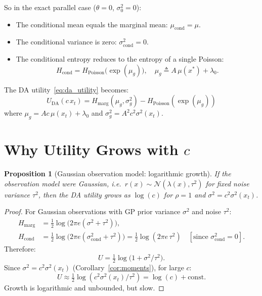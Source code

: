 \documentclass[11pt]{article}
\newtheorem{proposition}{Proposition}
\begin{document}
So in the exact parallel case ($\theta = 0$, $\sigma_0^2 = 0$):
\begin{itemize}
    \item The conditional mean equals the marginal mean: $\mu_{\text{cond}} = \mu$.
    \item The conditional variance is zero: $\sigma^2_{\text{cond}} = 0$.
    \item The conditional entropy reduces to the entropy of a single Poisson:
    \begin{equation}
        H_{\text{cond}} = H_{\text{Poisson}}\!\bigl(\exp(\mu_g)\bigr),
        \quad \mu_g \triangleq A \, \mu(x^*) + \lambda_0.
    \end{equation}
\end{itemize}

The DA utility~\eqref{eq:da_utility} becomes:
\begin{equation}\label{eq:utility_decomp}
    U_{\text{DA}}(c \, x_t) = H_{\text{marg}}(\mu_g, \sigma^2_g) - H_{\text{Poisson}}(\exp(\mu_g))
\end{equation}
where $\mu_g = A c \, \mu(x_t) + \lambda_0$ and $\sigma^2_g = A^2 c^2 \sigma^2(x_t)$.

\section{Why Utility Grows with $c$}

\begin{proposition}[Gaussian observation model: logarithmic growth]\label{prop:gaussian}
If the observation model were Gaussian, i.e.\
$r(x) \sim \mathcal{N}(\lambda(x), \tau^2)$ for fixed noise variance $\tau^2$,
then the DA utility grows as $\log(c)$ for $\rho = 1$ and $\sigma^2 = c^2 \sigma^2(x_t)$.
\end{proposition}

\begin{proof}
For Gaussian observations with GP prior variance $\sigma^2$ and noise $\tau^2$:
\begin{align}
    H_{\text{marg}} &= \tfrac{1}{2}\log\bigl(2\pi e (\sigma^2 + \tau^2)\bigr), \\
    H_{\text{cond}} &= \tfrac{1}{2}\log\bigl(2\pi e (\sigma^2_{\text{cond}} + \tau^2)\bigr)
    = \tfrac{1}{2}\log(2\pi e \, \tau^2) \quad [\text{since } \sigma^2_{\text{cond}} = 0].
\end{align}
Therefore:
\[
    U = \tfrac{1}{2}\log\!\bigl(1 + \sigma^2/\tau^2\bigr).
\]
Since $\sigma^2 = c^2 \sigma^2(x_t)$ (Corollary~\ref{cor:moments}), for large $c$:
\[
    U \approx \tfrac{1}{2}\log(c^2 \sigma^2(x_t)/\tau^2) = \log(c) + \text{const}.
\]
Growth is logarithmic and unbounded, but slow.
\end{proof}
\end{document}
